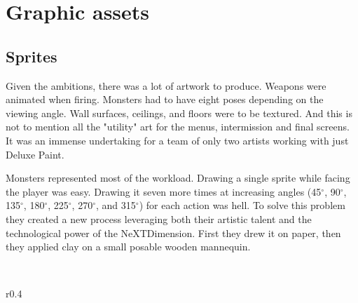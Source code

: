 \section{Graphic assets}
\subsection{Sprites}
Given the ambitions, there was a lot of artwork to produce. Weapons were animated when firing. Monsters had to have eight poses depending on the viewing angle. Wall surfaces, ceilings, and floors were to be textured. And this is not to mention all the "utility" art for the menus, intermission and final screens. It was an immense undertaking for a team of only two artists working with just Deluxe Paint.\\
\par
Monsters represented most of the workload. Drawing a single sprite while facing the player was easy. Drawing it seven more times at increasing angles (45$^{\circ}$, 90$^{\circ}$, 135$^{\circ}$, 180$^{\circ}$, 225$^{\circ}$, 270$^{\circ}$, and 315$^{\circ}$) for each action was hell. To solve this problem they created a new process leveraging both their artistic talent and the technological power of the NeXTDimension. First they drew it on paper, then they applied clay on a small posable wooden mannequin.\\
\par


\\


\begin{wrapfigure}[8]{r}{0.4\textwidth}
\centering
{}
\end{wrapfigure}

